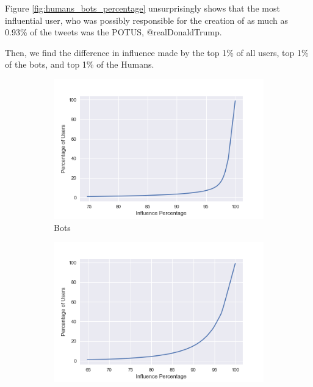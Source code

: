 \documentclass[letterpaper]{article}
\begin{document}
Figure \ref{fig:humans_bots_percentage} unsurprisingly shows that the most influential user, who was possibly responsible for the creation of as much as 0.93\%
of the tweets was the POTUS, @realDonaldTrump.\par

Then, we find the difference in influence made by the top 1\% of all users, top 1\% of the bots, and top 1\% of the Humans. 

\begin{figure}[H]
    \centering
    \captionsetup{justification=centering}

    \begin{subfigure}[b]{0.4\linewidth}
      \includegraphics[width=\linewidth]{images/top_1per_bots.png}
      \caption{Bots}
    \end{subfigure}
    \begin{subfigure}[b]{0.4\linewidth}
      \includegraphics[width=\linewidth]{images/top_1per_humans.png}

\end{subfigure}
\end{figure}
\end{document}
